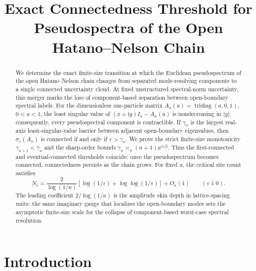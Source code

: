 \documentclass[12pt,anonymous]{iopjournal}
\numberwithin{equation}{section}
\theoremstyle{remark}
\DeclareMathOperator{\tridiag}{tridiag}
\newcommand{\ii}{\mathrm i}
\begin{document}
\reversemarginpar
\begingroup
\endgroup

\title{Exact Connectedness Threshold for Pseudospectra of the Open
Hatano--Nelson Chain}

\ifdefined\JPADoubleAnonymous
  \author{}
\else
  \JPAIdentifiedFrontMatter
\fi


\begin{abstract}
We determine the exact finite-size transition at which the Euclidean
pseudospectrum of the open Hatano--Nelson chain changes from separated
mode-resolving components to a single connected uncertainty cloud.  At fixed
unstructured spectral-norm uncertainty, this merger marks the loss of
component-based separation between open-boundary spectral labels.  For the
dimensionless one-particle matrix
\(A_n(a)=\tridiag(a,0,1)\), \(0<a<1\), the least singular value of
\((x+\ii y)I_n-A_n(a)\) is nondecreasing in \(\lvert y\rvert\); consequently,
every pseudospectral component is contractible.  If \(\gamma_n\) is the
largest real-axis least-singular-value barrier between adjacent open-boundary
eigenvalues, then
\(\sigma_\varepsilon(A_n)\) is connected if and only if
\(\varepsilon>\gamma_n\).  We prove the strict finite-size monotonicity
\(\gamma_{n+1}<\gamma_n\) and the sharp-order bounds
\(\gamma_n\asymp_a(n+1)a^{n/2}\).  Thus the first-connected and
eventual-connected thresholds coincide: once the pseudospectrum becomes
connected, connectedness persists as the chain grows.  For fixed \(a\), the
critical site count satisfies
\[
 N_c=\frac{2}{\log(1/a)}
 \left[\log(1/\varepsilon)+\log\!\log(1/\varepsilon)\right]+O_a(1)
 \qquad(\varepsilon\downarrow0).
\]
The leading coefficient \(2/\log(1/a)\) is the amplitude skin depth in
lattice-spacing units: the same imaginary gauge that localizes the
open-boundary modes sets the asymptotic finite-size scale for the collapse
of component-based worst-case spectral resolution.
\end{abstract}

\section{Introduction}\label{sec:introduction}
\end{document}
